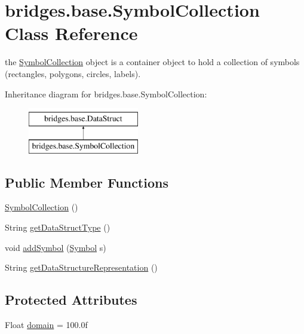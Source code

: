 \hypertarget{classbridges_1_1base_1_1_symbol_collection}{}\section{bridges.\+base.\+Symbol\+Collection Class Reference}
\label{classbridges_1_1base_1_1_symbol_collection}


the \mbox{\hyperlink{classbridges_1_1base_1_1_symbol_collection}{Symbol\+Collection}} object is a container object to hold a collection of symbols (rectangles, polygons, circles, labels).  


Inheritance diagram for bridges.\+base.\+Symbol\+Collection\+:\begin{figure}[H]
\begin{center}
\leavevmode
\includegraphics[height=2.000000cm]{classbridges_1_1base_1_1_symbol_collection}
\end{center}
\end{figure}
\subsection*{Public Member Functions}
\begin{DoxyCompactItemize}
\item 
\mbox{\hyperlink{classbridges_1_1base_1_1_symbol_collection_a8959dab963ce54f56560c6c27a3a3de5}{Symbol\+Collection}} ()
\item 
String \mbox{\hyperlink{classbridges_1_1base_1_1_symbol_collection_afbc928d2e6818edec96d10f52feebacb}{get\+Data\+Struct\+Type}} ()
\item 
void \mbox{\hyperlink{classbridges_1_1base_1_1_symbol_collection_a8e934c53b78b05a7e982f3ff2362adea}{add\+Symbol}} (\mbox{\hyperlink{classbridges_1_1base_1_1_symbol}{Symbol}} s)
\item 
String \mbox{\hyperlink{classbridges_1_1base_1_1_symbol_collection_a706ad8a7bcf12c194403ac3281c73674}{get\+Data\+Structure\+Representation}} ()
\end{DoxyCompactItemize}
\subsection*{Protected Attributes}
\begin{DoxyCompactItemize}
\item 
Float \mbox{\hyperlink{classbridges_1_1base_1_1_symbol_collection_a7624e96d2a4b5b6264791eb8dacbd350}{domain}} = 100.\+0f
\end{DoxyCompactItemize}


